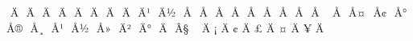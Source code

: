 \mubyte ^^80 ^^c4^^82\endmubyte %
\mubyte ^^81 ^^c4^^84\endmubyte %
\mubyte ^^82 ^^c4^^86\endmubyte %
\mubyte ^^83 ^^c4^^8c\endmubyte %
\mubyte ^^84 ^^c4^^8e\endmubyte %
\mubyte ^^85 ^^c4^^9a\endmubyte %
\mubyte ^^86 ^^c4^^98\endmubyte %
\mubyte ^^87 ^^c4^^9e\endmubyte %
\mubyte ^^88 ^^c4^^b9\endmubyte %
\mubyte ^^89 ^^c4^^bd\endmubyte %
\mubyte ^^8a ^^c5^^81\endmubyte %
\mubyte ^^8b ^^c5^^83\endmubyte %
\mubyte ^^8c ^^c5^^87\endmubyte %
\mubyte ^^8d ^^c5^^8a\endmubyte %
\mubyte ^^8e ^^c5^^90\endmubyte %
\mubyte ^^8f ^^c5^^94\endmubyte %
\mubyte ^^90 ^^c5^^98\endmubyte %
\mubyte ^^91 ^^c5^^9a\endmubyte %
\mubyte ^^92 ^^c5^^a0\endmubyte %
\mubyte ^^93 ^^c5^^9e\endmubyte %
\mubyte ^^94 ^^c5^^a4\endmubyte %
\mubyte ^^95 ^^c5^^a2\endmubyte %
\mubyte ^^96 ^^c5^^b0\endmubyte %
\mubyte ^^97 ^^c5^^ae\endmubyte %
\mubyte ^^98 ^^c5^^b8\endmubyte %
\mubyte ^^99 ^^c5^^b9\endmubyte %
\mubyte ^^9a ^^c5^^bd\endmubyte %
\mubyte ^^9b ^^c5^^bb\endmubyte %
\mubyte ^^9c ^^c4^^b2\endmubyte %
\mubyte ^^9d ^^c4^^b0\endmubyte %
\mubyte ^^9e ^^c4^^91\endmubyte %
\mubyte ^^9f ^^c2^^a7\endmubyte %
\mubyte ^^a0 ^^c4^^83\endmubyte %
\mubyte ^^a1 ^^c4^^85\endmubyte %
\mubyte ^^a2 ^^c4^^87\endmubyte %
\mubyte ^^a3 ^^c4^^8d\endmubyte %
\mubyte ^^a4 ^^c4^^8f\endmubyte %
\mubyte ^^a5 ^^c4^^9b\endmubyte %
